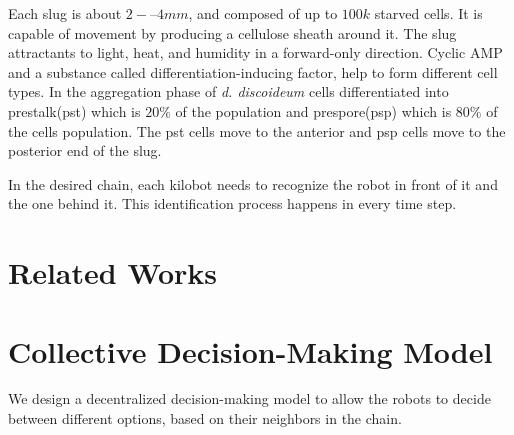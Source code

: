 \documentclass[11pt,a4paper]{article}
\begin{document}
Each slug is about $2-–4 mm$, and composed of up to $100k$ starved cells. It is capable of movement by producing a cellulose sheath around it. The slug attractants to light, heat, and humidity in a forward-only direction. Cyclic AMP and a substance called differentiation-inducing factor, help to form different cell types. In the aggregation phase of \textit{d. discoideum} cells differentiated into prestalk(pst) which is $20\%$ of the population and prespore(psp) which is $80\%$ of the cells population. The pst cells move to the anterior and psp cells move to the posterior end of the slug.

In the desired chain, each kilobot needs to recognize the robot in front of it and the one behind it. This identification process happens in every time step. 
\section {Related Works}

\section{Collective Decision-Making Model}
We design a decentralized decision-making model to allow the robots to decide between different options, based on their neighbors in the chain. 




 
 


 
\end{document}
